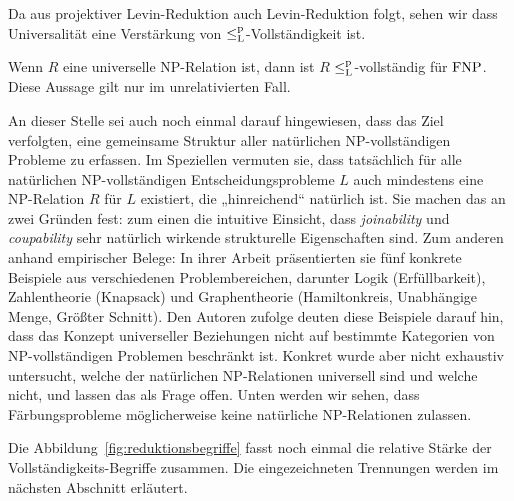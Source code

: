 Da aus projektiver Levin-Reduktion auch Levin-Reduktion folgt, sehen wir dass Universalität eine Verstärkung von $\leq_\mathrm{L}^\mathrm{p}$-Vollständigkeit ist.
\begin{corollary}
    Wenn $R$ eine universelle NP-Relation ist, dann ist $R$ $\leq_\mathrm{L}^\mathrm{p}$-vollständig für $\mathrm{FNP}$.
    Diese Aussage gilt nur im unrelativierten Fall.
\end{corollary}

An dieser Stelle sei auch noch einmal darauf hingewiesen, dass \textcite{agrawal_universal_1992} das Ziel verfolgten, eine gemeinsame Struktur aller natürlichen NP-vollständigen Probleme zu erfassen. Im Speziellen vermuten sie, dass tatsächlich für alle natürlichen NP-vollständigen Entscheidungsprobleme $L$ auch mindestens eine NP-Relation $R$ für $L$ existiert, die „hinreichend“ natürlich ist. Sie machen das an zwei Gründen fest: zum einen die intuitive Einsicht, dass \emph{joinability} und \emph{coupability} sehr natürlich wirkende strukturelle Eigenschaften sind. Zum anderen anhand empirischer Belege: 
 In ihrer Arbeit präsentierten sie fünf konkrete Beispiele aus verschiedenen Problembereichen, darunter Logik (Erfüllbarkeit), Zahlentheorie (Knapsack) und Graphentheorie (Hamiltonkreis, Unabhängige Menge, Größter Schnitt). Den Autoren zufolge deuten diese Beispiele darauf hin, dass das Konzept universeller Beziehungen nicht auf bestimmte Kategorien von NP-vollständigen Problemen beschränkt ist. 
 Konkret wurde aber nicht exhaustiv untersucht, welche der natürlichen NP-Relationen universell sind und welche nicht, und \textcite{agrawal_universal_1992} lassen das als Frage offen. Unten werden wir sehen, dass Färbungsprobleme möglicherweise keine natürliche NP-Relationen zulassen. %

Die Abbildung~\ref{fig:reduktionsbegriffe} fasst noch einmal die relative Stärke der Vollständigkeits-Begriffe zusammen. Die eingezeichneten Trennungen werden im nächsten Abschnitt erläutert.

